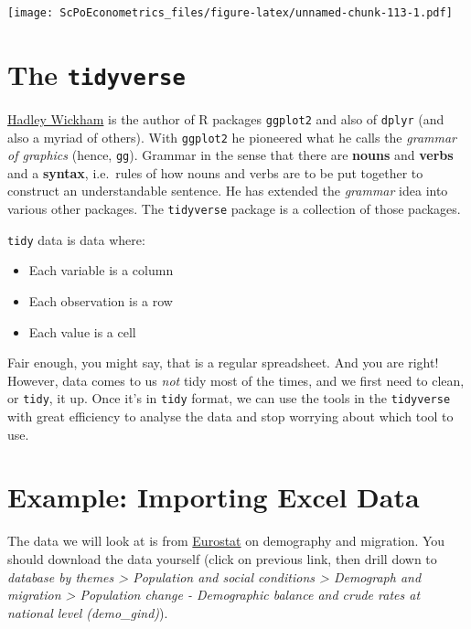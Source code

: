 \documentclass[]{book}
\providecommand{\tightlist}{%
  \setlength{\itemsep}{0pt}\setlength{\parskip}{0pt}}
\theoremstyle{definition}
\theoremstyle{definition}
\theoremstyle{definition}
\theoremstyle{remark}
\begin{document}
\texttt{[image: ScPoEconometrics\_files/figure-latex/unnamed-chunk-113-1.pdf]}

\section{\texorpdfstring{The
\texttt{tidyverse}}{The tidyverse}}\label{the-tidyverse}

\href{http://hadley.nz}{Hadley Wickham} is the author of R packages
\texttt{ggplot2} and also of \texttt{dplyr} (and also a myriad of
others). With \texttt{ggplot2} he pioneered what he calls the
\emph{grammar of graphics} (hence, \texttt{gg}). Grammar in the sense
that there are \textbf{nouns} and \textbf{verbs} and a \textbf{syntax},
i.e.~rules of how nouns and verbs are to be put together to construct an
understandable sentence. He has extended the \emph{grammar} idea into
various other packages. The \texttt{tidyverse} package is a collection
of those packages.

\texttt{tidy} data is data where:

\begin{itemize}
\tightlist
\item
  Each variable is a column
\item
  Each observation is a row
\item
  Each value is a cell
\end{itemize}

Fair enough, you might say, that is a regular spreadsheet. And you are
right! However, data comes to us \emph{not} tidy most of the times, and
we first need to clean, or \texttt{tidy}, it up. Once it's in
\texttt{tidy} format, we can use the tools in the \texttt{tidyverse}
with great efficiency to analyse the data and stop worrying about which
tool to use.

\section{Example: Importing Excel
Data}\label{example-importing-excel-data}

The data we will look at is from
\href{http://ec.europa.eu/eurostat/data/database}{Eurostat} on
demography and migration. You should download the data yourself (click
on previous link, then drill down to \emph{database by themes
\textgreater{} Population and social conditions \textgreater{} Demograph
and migration \textgreater{} Population change - Demographic balance and
crude rates at national level (demo\_gind)}).
\end{document}
